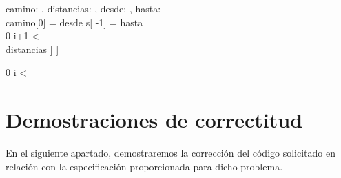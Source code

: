 \documentclass[10pt,a4paper]{article}
\newcommand{\matrizEnt}{\TLista{\TLista{\ent}}}
\begin{document}
{camino: \TLista{\ent}, distancias: \matrizEnt, desde: \ent, hasta: \ent}
{
	  \yLuego \\
	camino[0] = desde \land  s[ -1] = hasta \land \\
	 {\ent} { 0 \leq i+1 <  \\  	\implicaLuego distancias \; [\;camino[i]\;] \; [\;camino[i+1]\;] 
	}
}

{
 0 \leq i < 
}





\section{Demostraciones de correctitud}

En el siguiente apartado, demostraremos la corrección del código solicitado  en relación con la especificación proporcionada para dicho problema.  
\end{document}
